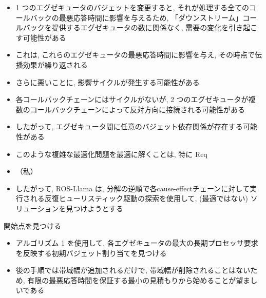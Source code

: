 \begin{frame}{}
    \begin{itemize}
        \item 1 つのエグゼキュータのバジェットを変更すると, それが処理する全てのコールバックの最悪応答時間に影響を与えるため, 「ダウンストリーム」コールバックを提供するエグゼキュータの数に関係なく, 需要の変化を引き起こす可能性がある
        \item これは, これらのエグゼキュータの最悪応答時間に影響を与え, その時点で伝播効果が繰り返される
        \item さらに悪いことに, 影響サイクルが発生する可能性がある
        \item 各コールバックチェーンにはサイクルがないが, 2 つのエグゼキュータが複数のコールバックチェーンによって反対方向に接続される可能性がある
    \end{itemize}
\end{frame}

\begin{frame}{}
    \begin{itemize}
        \item したがって, エグゼキュータ間に任意のバジェット依存関係が存在する可能性がある
        \item このような複雑な最適化問題を最適に解くことは, 特に Req
        \item （私）
        \item したがって, ROS-Llama は, 分解の逆順で各cause-effectチェーンに対して実行される反復ヒューリスティック駆動の探索を使用して, (最適ではない) ソリューションを見つけようとする
    \end{itemize}
\end{frame}

\begin{frame}{開始点を見つける}
    \begin{itemize}
        \item アルゴリズム 1 を使用して, 各エグゼキュータの最大の長期プロセッサ要求を反映する初期バジェット割り当てを見つける
        \item 後の手順では帯域幅が追加されるだけで, 帯域幅が削除されることはないため, 有限の最悪応答時間を保証する最小の見積もりから始めることが望ましいである
    \end{itemize}
\end{frame}

